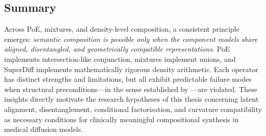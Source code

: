 \vspace{1em}
\subsection*{Summary}

Across PoE, mixtures, and density-level composition, a consistent principle
emerges: \emph{semantic composition is possible only when the component models
share aligned, disentangled, and geometrically compatible representations}. PoE
implements intersection-like conjunction, mixtures implement unions, and
SuperDiff implements mathematically rigorous density arithmetic. Each operator
has distinct strengths and limitations, but all exhibit predictable failure modes
when structural preconditions—in the sense established by
\citet{mechanisms2025projective}—are violated. These insights
directly motivate the research hypotheses of this thesis concerning latent
alignment, disentanglement, conditional factorisation, and curvature
compatibility as necessary conditions for clinically meaningful compositional
synthesis in medical diffusion models.